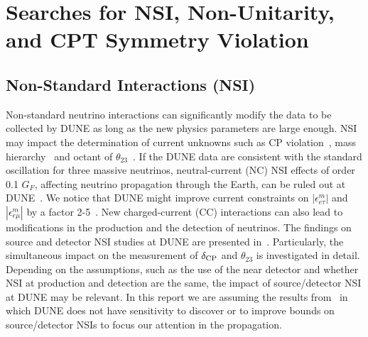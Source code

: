 
\section{Searches for NSI, Non-Unitarity, and CPT Symmetry Violation}
\subsection{Non-Standard Interactions (NSI)}
\label{sec:nsi}
Non-standard neutrino interactions can significantly modify the data to be collected by DUNE as long as the new physics parameters are large enough. NSI may impact the determination of current unknowns such as CP violation~\cite{Masud:2015xva,Masud:2016bvp}, mass hierarchy~\cite{Masud:2016gcl} and octant of $\theta_{23}$~\cite{Agarwalla:2016fkh}. If the DUNE data are consistent with the standard oscillation for three massive neutrinos, neutral-current (NC) NSI effects of order 0.1 $G_F$, affecting neutrino propagation through the Earth, can be ruled out at DUNE~\cite{deGouvea:2015ndi,Coloma:2015kiu}. We notice that DUNE might improve current constraints on $|\epsilon^m_{e \tau}|$ and $|\epsilon^m_{e \mu}|$ by a factor 2-5~\cite{Ohlsson:2012kf,Miranda:2015dra,Farzan:2017xzy}. New charged-current (CC) interactions can also lead to modifications in the production and the detection of neutrinos. The findings on source and detector NSI studies at DUNE are presented in~\cite{Blennow:2016etl,Bakhti:2016gic}. Particularly, the simultaneous impact on the measurement of $\delta_{\rm CP}$ and $\theta_{23}$ is investigated in detail. Depending on the assumptions, such as the use of the near detector and whether NSI at production and detection are the same, the impact of source/detector NSI at DUNE may be relevant. In this report we are assuming the results from~\cite{Blennow:2016etl} in which DUNE does not have sensitivity to discover or to improve bounds on source/detector NSIs to focus our attention in the propagation.

